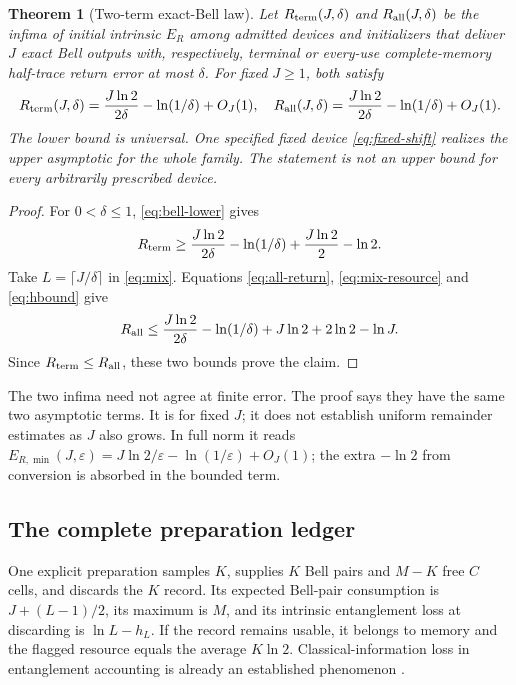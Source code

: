 \documentclass[11pt,a4paper]{article}
\numberwithin{equation}{section}
\newtheorem{theorem}{Theorem}[section]
\theoremstyle{remark}
\newcommand{\ER}{E_R}
\begin{document}
\begin{theorem}[Two-term exact-Bell law]\label{thm:log}
Let \(R_{\rm term}(J,\delta)\) and \(R_{\rm all}(J,\delta)\) be the infima
of initial intrinsic \(\ER\) among admitted devices and initializers that
deliver \(J\) exact Bell outputs with, respectively, terminal or every-use
complete-memory half-trace return error at most \(\delta\).
For fixed \(J\geq1\), both satisfy
\begin{equation}
 R_{\rm term}(J,\delta)
 =\frac{J\ln2}{2\delta}-\ln(1/\delta)+O_J(1),
 \quad
 R_{\rm all}(J,\delta)
 =\frac{J\ln2}{2\delta}-\ln(1/\delta)+O_J(1).      \label{eq:loglaw}
\end{equation}
The lower bound is universal. One specified fixed device
\eqref{eq:fixed-shift} realizes the upper asymptotic for the whole family.
The statement is not an upper bound for every arbitrarily prescribed device.
\end{theorem}
\begin{proof}
For \(0<\delta\leq1\), \eqref{eq:bell-lower} gives
\[
 R_{\rm term}\geq
 \frac{J\ln2}{2\delta}-\ln(1/\delta)
       +\frac{J\ln2}{2}-\ln2.
\]
Take \(L=\lceil J/\delta\rceil\) in \eqref{eq:mix}. Equations
\eqref{eq:all-return}, \eqref{eq:mix-resource} and \eqref{eq:hbound} give
\[
 R_{\rm all}\leq
 \frac{J\ln2}{2\delta}-\ln(1/\delta)
       +J\ln2+2\ln2-\ln J.
\]
Since \(R_{\rm term}\leq R_{\rm all}\), these two bounds prove the claim.
\end{proof}
The two infima need not agree at finite error. The proof says they have
the same two asymptotic terms. It is for fixed \(J\); it does not establish
uniform remainder estimates as \(J\) also grows. In full norm it reads
\(E_{R,\min}(J,\varepsilon)
=J\ln2/\varepsilon-\ln(1/\varepsilon)+O_J(1)\);
the extra \(-\ln2\) from conversion is absorbed in the bounded term.

\subsection{The complete preparation ledger}
One explicit preparation samples \(K\), supplies \(K\) Bell pairs and
\(M-K\) free \(C\) cells, and discards the \(K\) record. Its expected
Bell-pair consumption is \(J+(L-1)/2\), its maximum is \(M\), and its
intrinsic entanglement loss at discarding is \(\ln L-h_L\).
If the record remains usable, it belongs to memory and the flagged
resource equals the average \(K\ln2\). Classical-information loss in
entanglement accounting is already an established phenomenon \cite{HV}.
\end{document}
